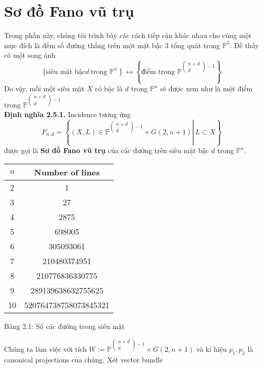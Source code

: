 \documentclass[11pt,a4paper]{book}
\begin{document}
\section{Sơ đồ Fano vũ trụ}

Trong phần này, chúng tôi trình bày các cách tiếp cận khác nhau cho cùng một mục đích là đếm số đường thẳng trên một mặt bậc 3 tổng quát trong $\mathbb{P}^3$.
Dễ thấy có một song ánh
$$
\text { \{siêu mặt bậc} \left.d \ \text {trong \ } \mathbb{P}^n\right\} \longleftrightarrow\left\{\text {điểm trong\ } \mathbb{P}^{\begin{pmatrix}
		n+d\\
		d
\end{pmatrix}-1}\right\} .
$$
Do vậy, mỗi một siêu mặt $X$ có bậc là $d$ trong $\mathbb{P}^n$ sẽ được xem như là một điểm trong $\mathbb{P}^{\begin{pmatrix}
		n+d\\
		d
	\end{pmatrix}-1}$\\
\textbf{Định nghĩa 2.5.1.} Incidence tương ứng
$$
F_{n, d}=\left\{\left.(X, L) \in \mathbb{P}^{\begin{pmatrix}
		n+d\\
		d
	\end{pmatrix}-1} \times G(2, n+1) \right\rvert\, L \subset X\right\}
$$
được gọi là \textbf{Sơ đồ Fano vũ trụ} của các đường trên siêu mặt bậc $d$ trong $\mathbb{P}^n$.\\
\begin{center}\begin{tabular}{|c|c|}
	\hline$n$ & Number of lines \\
	\hline 2 & 1 \\
	3 & 27 \\
	4 & 2875 \\
	5 & 698005 \\
	6 & 305093061 \\
	7 & 210480374951 \\
	8 & 210776836330775 \\
	9 & 289139638632755625 \\
	10 & 520764738758073845321 \\
	\hline
\end{tabular}\end{center}
\begin{center}
	Bảng 2.1: Số các đường trong siêu mặt
\end{center}
Chúng ta làm việc với tích $W:=\mathbb{P}^{\begin{pmatrix}
		n+d\\
		d
	\end{pmatrix}-1} \times G(2, n+1)$ và kí hiệu $p_1, p_2$ là canonical projections của chúng. Xét vector bundle
\end{document}

